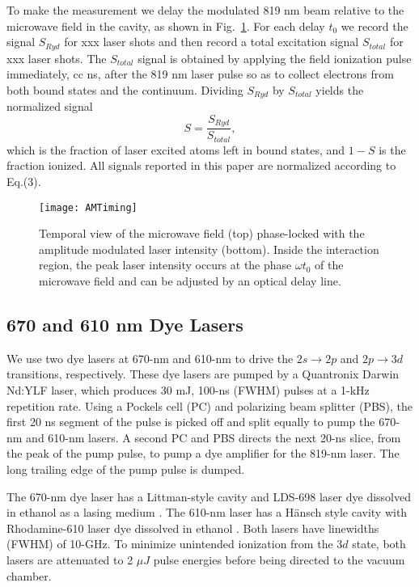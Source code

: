 \documentclass[aps,pra,preprint,groupedaddress]{revtex4-1}
\begin{document}
To make the measurement we delay the modulated 819 nm beam relative to the microwave field in the cavity, as shown in Fig.~\ref{fig:AMLaser}. For each delay $t_0$ we record the signal $S_{Ryd}$ for xxx laser shots and then record a total excitation signal $S_{total}$ for xxx laser shots. The $S_{total}$ signal is obtained by applying the field ionization pulse immediately, cc ns, after the 819 nm laser pulse so as to collect electrons from both bound states and the continuum. Dividing $S_{Ryd}$ by $S_{total}$ yields the normalized signal
\begin{equation}
S=\frac{S_{Ryd}}{S_{total}},
\end{equation}
which is the fraction of laser excited atoms left in bound states, and $1-S$ is the fraction ionized. All signals reported in this paper are normalized according to Eq.(3).

\begin{figure}
	\texttt{[image: AMTiming]}
	\caption{Temporal view of the microwave field (top) phase-locked with the amplitude modulated laser intensity (bottom). Inside the interaction region, the peak laser intensity occurs at the phase $\omega t_0$ of the microwave field and can be adjusted by an optical delay line.}
	\label{fig:AMLaser}
\end{figure}

\subsection{\label{sec:dye} 670 and 610 nm Dye Lasers}

We use two dye lasers at 670-nm and 610-nm to drive the $2s \rightarrow 2p$ and $2p \rightarrow 3d$ transitions, respectively. These dye lasers are pumped by a Quantronix Darwin Nd:YLF laser, which produces 30 mJ, 100-ns (FWHM) pulses at a 1-kHz repetition rate. Using a Pockels cell (PC) and polarizing beam splitter (PBS), the first 20 ns segment of the pulse is picked off and split equally to pump the 670-nm and 610-nm lasers. A second PC and PBS directs the next 20-ns slice, from the peak of the pump pulse, to pump a dye amplifier for the 819-nm laser. The long trailing edge of the pump pulse is dumped.

The 670-nm dye laser has a Littman-style cavity and LDS-698 laser dye dissolved in ethanol as a lasing medium \cite{Littman}. The 610-nm laser has a H{\"a}nsch style cavity with Rhodamine-610 laser dye dissolved in ethanol \cite{Hansch}. Both lasers have linewidths (FWHM) of 10-GHz. To minimize unintended ionization from the $3d$ state, both lasers are attenuated to 2 $\mu J$ pulse energies before being directed to the vacuum chamber.
\end{document}
